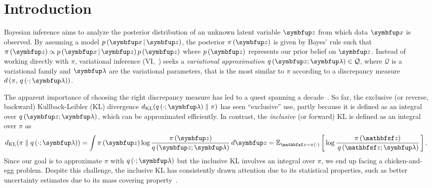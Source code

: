 
\section{Introduction}\label{section:intro}
Bayesian inference aims to analyze the posterior distribution of an unknown latent variable \(\vz\) from which data \(\vx\) is observed.
By assuming a model \(p\,(\vx\,|\,\vz)\), the posterior \(\pi\,(\vz)\) is given by Bayes' rule such that \(\pi\,(\vz) \propto {p\,(\vx\,|\,\vz)\,p\,(\vz)}\) where \(p\,(\vz)\) represents our prior belief on \(\vz\).
Instead of working directly with \(\pi\), variational inference (VI,~\citealt{blei_variational_2017}) seeks a \textit{variational approximation} \(q\,(\vz; \vlambda) \in \mathcal{Q}\), where \(\mathcal{Q}\) is a variational family and \(\vlambda\) are the variational parameters, that is the most similar to \(\pi\) according to a discrepancy measure \(d\,(\pi,\, q\,(\cdot; \vlambda))\).

The apparent importance of choosing the right discrepancy measure has led to a quest spanning a decade~\citep{NIPS2017_35464c84, NEURIPS2018_1cd138d0, NEURIPS2020_c928d86f, regli_alphabeta_2018, pmlr-v48-hernandez-lobatob16,NIPS2016_7750ca35,pmlr-v37-salimans15,pmlr-v97-ruiz19a,NEURIPS2021_05f971b5,NEURIPS2021_a1a609f1, bamler_perturbative_2017}.
So far, the exclusive (or reverse, backward)  Kullback-Leibler (KL) divergence \(\DKL{q\left(\cdot; \vlambda\right)}{\pi}\) has seen ``exclusive'' use, partly because it is defined as an integral over \(q\,(\vz; \vlambda)\), which can be approximated efficiently.
In contrast, the \textit{inclusive} (or forward) KL is defined as an integral over \(\pi\) as
%
{%
\vspace{-0.05in}
\begin{align*}
  \DKL{\pi}{q\left(\cdot; \vlambda\right)}
  = \int \pi\,(\vz) \log \frac{\pi\left(\vz\right)}{q\,(\vz; \vlambda)} \,d\vz
  = \Esub{\rvvz \sim \pi\left(\cdot\right)}{\log \frac{\pi\left(\rvvz\right)}{\,q\,(\rvvz; \vlambda)} }. %
\end{align*}
}%
Since our goal is to approximate \(\pi\) with \(q\left(\cdot;\vlambda\right)\) but the inclusive KL involves an integral over \(\pi\), we end up facing a chicken-and-egg problem.
Despite this challenge, the inclusive KL has consistently drawn attention due to its statistical properties, such as better uncertainty estimates due to its mass covering property~\citep{minka2005divergence, mackay_local_2001, trippe_overpruning_2017}.

